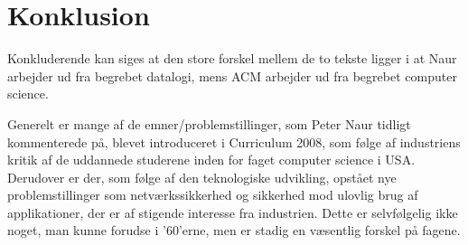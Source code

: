 \documentclass[10pt,a4paper]{article}
\begin{document}
\section{Konklusion}
Konkluderende kan siges at den store forskel mellem de to tekste ligger i at Naur arbejder ud fra begrebet datalogi, mens ACM arbejder ud fra begrebet computer science. %

Generelt er mange af de emner/problemstillinger, som Peter Naur tidligt kommenterede på, blevet introduceret i Curriculum 2008, som følge af industriens kritik af de uddannede studerene inden for faget computer science i USA. Derudover er der, som følge af den teknologiske udvikling, opstået nye problemstillinger som netværkssikkerhed og sikkerhed mod ulovlig brug af applikationer, der er af stigende interesse fra industrien. Dette er selvfølgelig ikke noget, man kunne forudse i '60'erne, men er stadig en væsentlig forskel på fagene.
\end{document}
